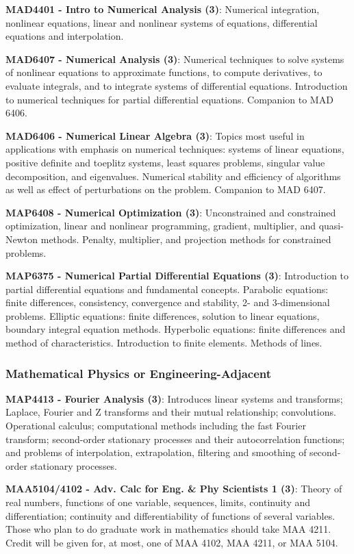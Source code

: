 \documentclass[11pt]{article}
\begin{document}
\textbf{MAD4401 - Intro to Numerical Analysis (3)}: Numerical integration, nonlinear equations, linear and nonlinear systems of equations, differential equations and interpolation.

\textbf{MAD6407 - Numerical Analysis (3)}: Numerical techniques to solve systems of nonlinear equations to approximate functions, to compute derivatives, to evaluate integrals, and to integrate systems of differential equations. Introduction to numerical techniques for partial differential equations. Companion to MAD 6406.

\textbf{MAD6406 - Numerical Linear Algebra (3)}: Topics most useful in applications with emphasis on numerical techniques: systems of linear equations, positive definite and toeplitz systems, least squares problems, singular value decomposition, and eigenvalues. Numerical stability and efficiency of algorithms as well as effect of perturbations on the problem. Companion to MAD 6407.

\textbf{MAP6408 - Numerical Optimization (3)}: Unconstrained and constrained optimization, linear and nonlinear programming, gradient, multiplier, and quasi-Newton methods. Penalty, multiplier, and projection methods for constrained problems.

\textbf{MAP6375 - Numerical Partial Differential Equations (3)}: Introduction to partial differential equations and fundamental concepts. Parabolic equations: finite differences, consistency, convergence and stability, 2- and 3-dimensional problems. Elliptic equations: finite differences, solution to linear equations, boundary integral equation methods. Hyperbolic equations: finite differences and method of characteristics. Introduction to finite elements. Methods of lines.

\subsubsection{\colorbox{phys}{Mathematical Physics or Engineering-Adjacent}}

\textbf{MAP4413 - Fourier Analysis (3)}: Introduces linear systems and transforms; Laplace, Fourier and Z transforms and their mutual relationship; convolutions. Operational calculus; computational methods including the fast Fourier transform; second-order stationary processes and their autocorrelation functions; and problems of interpolation, extrapolation, filtering and smoothing of second-order stationary processes.

\textbf{MAA5104/4102 - Adv. Calc for Eng. \& Phy Scientists 1 (3)}: Theory of real numbers, functions of one variable, sequences, limits, continuity and differentiation; continuity and differentiability of functions of several variables. Those who plan to do graduate work in mathematics should take MAA 4211. Credit will be given for, at most, one of MAA 4102, MAA 4211, or MAA 5104.
\end{document}
